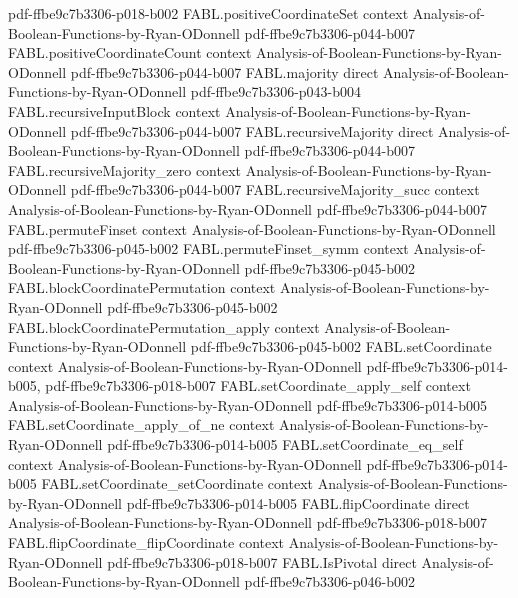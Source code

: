 \begin{theorem}
  {pdf-ffbe9c7b3306-p018-b002}
\proofstep
  {FABL.positiveCoordinateSet}
  {context}
  {Analysis-of-Boolean-Functions-by-Ryan-ODonnell}
  {pdf-ffbe9c7b3306-p044-b007}
\proofstep
  {FABL.positiveCoordinateCount}
  {context}
  {Analysis-of-Boolean-Functions-by-Ryan-ODonnell}
  {pdf-ffbe9c7b3306-p044-b007}
\proofstep
  {FABL.majority}
  {direct}
  {Analysis-of-Boolean-Functions-by-Ryan-ODonnell}
  {pdf-ffbe9c7b3306-p043-b004}
\proofstep
  {FABL.recursiveInputBlock}
  {context}
  {Analysis-of-Boolean-Functions-by-Ryan-ODonnell}
  {pdf-ffbe9c7b3306-p044-b007}
\proofstep
  {FABL.recursiveMajority}
  {direct}
  {Analysis-of-Boolean-Functions-by-Ryan-ODonnell}
  {pdf-ffbe9c7b3306-p044-b007}
\proofstep
  {FABL.recursiveMajority_zero}
  {context}
  {Analysis-of-Boolean-Functions-by-Ryan-ODonnell}
  {pdf-ffbe9c7b3306-p044-b007}
\proofstep
  {FABL.recursiveMajority_succ}
  {context}
  {Analysis-of-Boolean-Functions-by-Ryan-ODonnell}
  {pdf-ffbe9c7b3306-p044-b007}
\proofstep
  {FABL.permuteFinset}
  {context}
  {Analysis-of-Boolean-Functions-by-Ryan-ODonnell}
  {pdf-ffbe9c7b3306-p045-b002}
\proofstep
  {FABL.permuteFinset_symm}
  {context}
  {Analysis-of-Boolean-Functions-by-Ryan-ODonnell}
  {pdf-ffbe9c7b3306-p045-b002}
\proofstep
  {FABL.blockCoordinatePermutation}
  {context}
  {Analysis-of-Boolean-Functions-by-Ryan-ODonnell}
  {pdf-ffbe9c7b3306-p045-b002}
\proofstep
  {FABL.blockCoordinatePermutation_apply}
  {context}
  {Analysis-of-Boolean-Functions-by-Ryan-ODonnell}
  {pdf-ffbe9c7b3306-p045-b002}
\proofstep
  {FABL.setCoordinate}
  {context}
  {Analysis-of-Boolean-Functions-by-Ryan-ODonnell}
  {pdf-ffbe9c7b3306-p014-b005,
    pdf-ffbe9c7b3306-p018-b007}
\proofstep
  {FABL.setCoordinate_apply_self}
  {context}
  {Analysis-of-Boolean-Functions-by-Ryan-ODonnell}
  {pdf-ffbe9c7b3306-p014-b005}
\proofstep
  {FABL.setCoordinate_apply_of_ne}
  {context}
  {Analysis-of-Boolean-Functions-by-Ryan-ODonnell}
  {pdf-ffbe9c7b3306-p014-b005}
\proofstep
  {FABL.setCoordinate_eq_self}
  {context}
  {Analysis-of-Boolean-Functions-by-Ryan-ODonnell}
  {pdf-ffbe9c7b3306-p014-b005}
\proofstep
  {FABL.setCoordinate_setCoordinate}
  {context}
  {Analysis-of-Boolean-Functions-by-Ryan-ODonnell}
  {pdf-ffbe9c7b3306-p014-b005}
\proofstep
  {FABL.flipCoordinate}
  {direct}
  {Analysis-of-Boolean-Functions-by-Ryan-ODonnell}
  {pdf-ffbe9c7b3306-p018-b007}
\proofstep
  {FABL.flipCoordinate_flipCoordinate}
  {context}
  {Analysis-of-Boolean-Functions-by-Ryan-ODonnell}
  {pdf-ffbe9c7b3306-p018-b007}
\proofstep
  {FABL.IsPivotal}
  {direct}
  {Analysis-of-Boolean-Functions-by-Ryan-ODonnell}
  {pdf-ffbe9c7b3306-p046-b002}

\end{theorem}
